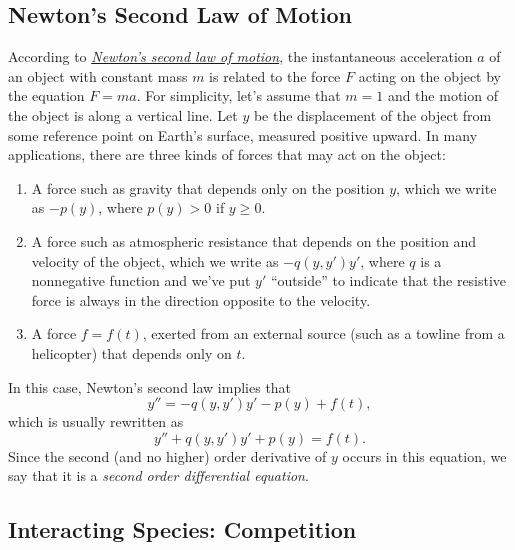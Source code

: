 \documentclass{ximera}
\begin{document}
\subsection*{Newton's Second Law of Motion}

According to
\href{http://www-history.mcs.st-and.ac.uk/Mathematicians/Newton.html}
{\textit{Newton's second law of motion}},  the
instantaneous acceleration
$a$ of an object with constant mass $m$ is related to the force $F$
acting on the object by the equation $F=ma$. For simplicity, let's
assume that $m=1$ and the motion of the object is along a vertical
line. Let $y$ be the displacement of the object from some reference
point on Earth's surface, measured positive upward. In many
applications, there are three kinds of forces that may act on the
object:

\begin{enumerate}
\item %
A force such as gravity that depends only on the position $y$,
which we write as $-p(y)$, where $p(y)>0$ if $y\ge0$.

\item %
A force such as atmospheric resistance that depends on
the position and velocity of the object, which we write as
$-q(y,y')y'$, where $q$ is a nonnegative function and we've
put $y'$ ``outside'' to indicate that the resistive force is
always in the direction opposite to the velocity.
\item %
A force $f=f(t)$, exerted from an external source (such as a towline
from a helicopter) that depends only on $t$.
\end{enumerate}

In this case, Newton's second law implies that
$$
y''=-q(y,y')y'-p(y)+f(t),
$$
which is usually rewritten as
$$
y''+q(y,y')y'+p(y)=f(t).
$$
Since the  second (and no higher) order derivative of $y$ occurs in
this equation, we say that it is a {\color{blue}\it second order differential
equation\/}.



\subsection*{Interacting Species: Competition}
\end{document}
